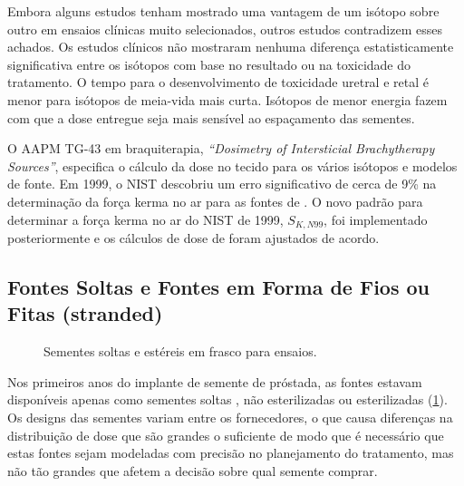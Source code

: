 \documentclass[11pt,a4paper]{article}
\begin{document}
	Embora alguns estudos tenham mostrado uma vantagem de um isótopo sobre outro em ensaios clínicas muito selecionados, outros estudos contradizem esses achados. Os estudos clínicos não mostraram nenhuma diferença estatisticamente significativa entre os isótopos com base no resultado ou na toxicidade do tratamento. O tempo para o desenvolvimento de toxicidade uretral e retal é menor para isótopos de meia-vida mais curta. Isótopos de menor energia fazem com que a dose entregue seja mais sensível ao espaçamento das sementes.

	O AAPM TG-43 em braquiterapia, \textit{``Dosimetry of Intersticial Brachytherapy Sources''}, especifica o cálculo da dose no tecido para os vários isótopos e modelos de fonte. Em 1999, o NIST descobriu um erro significativo de cerca de 9\% na determinação da força kerma no ar para as fontes de . O novo padrão para determinar a força kerma no ar do NIST de 1999, $S_{K,N99}$, foi implementado posteriormente e os cálculos de dose de  foram ajustados de acordo.

\subsection*{Fontes Soltas e Fontes em Forma de Fios ou Fitas (stranded)}

	\begin{figure}
		\centering
		\caption{Sementes soltas e estéreis em frasco para ensaios.}
		\label{fig:semenstesSoltasAssay}
	\end{figure}

	Nos primeiros anos do implante de semente de próstada, as fontes estavam disponíveis apenas como sementes soltas , não esterilizadas ou esterilizadas (\ref{fig:semenstesSoltasAssay}). Os designs das sementes variam entre os fornecedores, o que causa diferenças na distribuição de dose que são grandes o suficiente de modo que é necessário que estas fontes sejam modeladas com precisão no planejamento do tratamento, mas não tão grandes que afetem a decisão sobre qual semente comprar.
\end{document}
